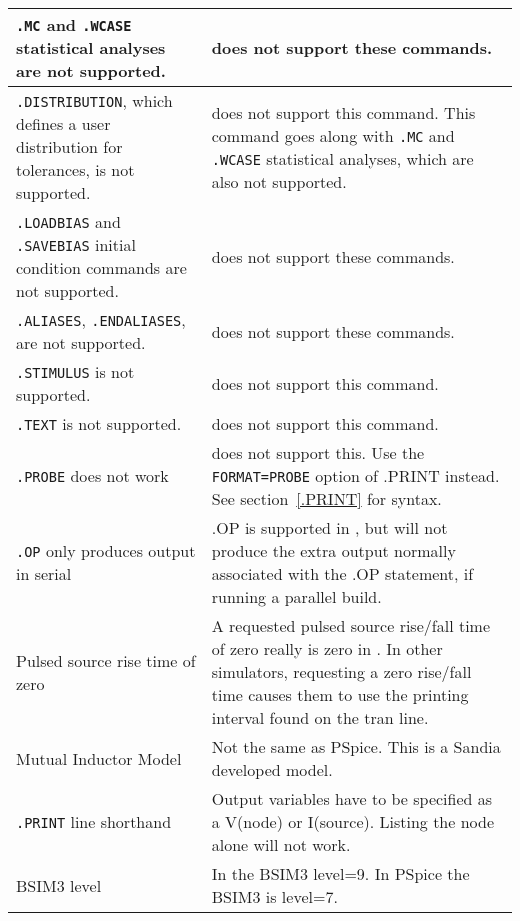 \begin{longtable}[h] {>{\raggedright\small}m{2in}|>{\raggedright\let\\\tabularnewline\small}m{4in}}
\texttt{.MC} and \texttt{.WCASE} statistical analyses are not supported.  
& \Xyce{} does not support these commands.  
\\ \hline

\texttt{.DISTRIBUTION}, which defines a user distribution for tolerances, is not supported.  
& \Xyce{} does not support this command.  This command goes along with 
\texttt{.MC} and \texttt{.WCASE} statistical analyses, which are also not supported. \\ \hline

\texttt{.LOADBIAS} and \texttt{.SAVEBIAS} initial condition commands are not supported.  
& \Xyce{} does not support these commands.  \\ \hline

\texttt{.ALIASES}, \texttt{.ENDALIASES}, are not supported.
& \Xyce{} does not support these commands.  \\ \hline

\texttt{.STIMULUS} is not supported.  & \Xyce{} does not support this command.  \\ \hline

\texttt{.TEXT} is not supported.  & \Xyce{} does not support this command.  \\ \hline

\texttt{.PROBE} does not work & \Xyce{} does not support this.  Use the 
\texttt{FORMAT=PROBE} option of .PRINT instead.  See 
section~\ref{.PRINT} for syntax.\\ \hline

\texttt{.OP} only produces output in serial & .OP is supported in \Xyce{}, but will not
produce the extra output normally associated with the .OP statement, if running a parallel build.\\ \hline

Pulsed source rise time of zero & A requested pulsed source rise/fall time of
zero really is zero in \Xyce{}.  In other simulators, requesting a zero
rise/fall time causes them to use the printing interval found on the tran
line.\\ \hline

Mutual Inductor Model & Not the same as PSpice.  This is a Sandia developed
model. \\ \hline

\texttt{.PRINT} line shorthand & Output variables have to be specified as a
V(node) or I(source). Listing the node alone will not work. \\ \hline

BSIM3 level & In \Xyce{} the BSIM3 level=9.  In PSpice the BSIM3 is
level=7. \\ \hline


\end{longtable}
